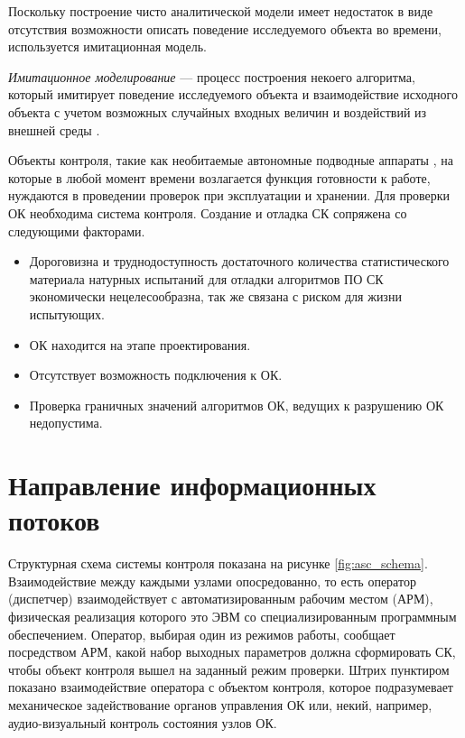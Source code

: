 
Поскольку построение чисто аналитической модели имеет недостаток  в виде отсутствия возможности
описать поведение исследуемого объекта во времени, используется имитационная модель.

\textit{Имитационное моделирование} --- процесс построения некоего алгоритма, который имитирует
поведение исследуемого объекта и взаимодействие исходного объекта с учетом возможных случайных входных величин и
воздействий из внешней среды \cite{book:vvedeni_imit_model_1987}.

Объекты контроля, такие как необитаемые автономные подводные аппараты \todo{\ldots},
на которые в любой момент времени возлагается функция готовности к  работе,
нуждаются в проведении проверок при эксплуатации и хранении.
%
Для проверки ОК необходима система контроля. Создание и отладка СК сопряжена со следующими факторами.
%
\begin{itemize}
    \item Дороговизна и труднодоступность достаточного количества статистического материала
    натурных испытаний для отладки алгоритмов ПО СК экономически нецелесообразна, так же связана с риском для жизни испытующих.
    \item ОК находится на этапе проектирования.
    \item Отсутствует возможность подключения к ОК.
    \item Проверка граничных значений алгоритмов ОК, ведущих к разрушению ОК недопустима.
\end{itemize}



\section{Направление информационных потоков} %

Структурная схема системы контроля показана на рисунке \ref{fig:asc_schema}.
Взаимодействие между каждыми узлами опосредованно, то есть
оператор (диспетчер) взаимодействует с автоматизированным рабочим местом (АРМ),
физическая реализация которого это ЭВМ со специализированным программным обеспечением.
Оператор, выбирая один из режимов работы, сообщает посредством АРМ,
какой набор выходных параметров должна сформировать СК, чтобы объект контроля вышел на заданный режим проверки.
Штрих пунктиром показано взаимодействие оператора с объектом контроля,
которое подразумевает механическое задействование органов управления ОК
или, некий, например, аудио-визуальный контроль состояния узлов ОК.

